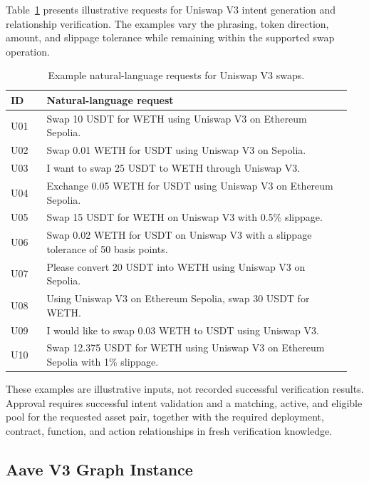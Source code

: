 \medskip

Table~\ref{tab:uniswap_user_queries} presents illustrative
requests for Uniswap V3 intent generation and relationship
verification. The examples vary the phrasing, token
direction, amount, and slippage tolerance while remaining
within the supported swap operation.

\begin{table}[htbp]
\centering
\small
\renewcommand{\arraystretch}{1.15}
\caption{Example natural-language requests for Uniswap V3 swaps.}
\label{tab:uniswap_user_queries}
\begin{tabular}{@{}p{0.10\linewidth}p{0.85\linewidth}@{}}
\hline
\textbf{ID} & \textbf{Natural-language request} \\
\hline
U01 & Swap 10 USDT for WETH using Uniswap V3 on Ethereum Sepolia. \\
U02 & Swap 0.01 WETH for USDT using Uniswap V3 on Sepolia. \\
U03 & I want to swap 25 USDT to WETH through Uniswap V3. \\
U04 & Exchange 0.05 WETH for USDT using Uniswap V3 on Ethereum Sepolia. \\
U05 & Swap 15 USDT for WETH on Uniswap V3 with 0.5\% slippage. \\
U06 & Swap 0.02 WETH for USDT on Uniswap V3 with a slippage tolerance of 50 basis points. \\
U07 & Please convert 20 USDT into WETH using Uniswap V3 on Sepolia. \\
U08 & Using Uniswap V3 on Ethereum Sepolia, swap 30 USDT for WETH. \\
U09 & I would like to swap 0.03 WETH to USDT using Uniswap V3. \\
U10 & Swap 12.375 USDT for WETH using Uniswap V3 on Ethereum Sepolia with 1\% slippage. \\
\hline
\end{tabular}
\end{table}

These examples are illustrative inputs, not recorded
successful verification results. Approval requires
successful intent validation and a matching, active,
and eligible pool for the requested asset pair, together
with the required deployment, contract, function, and
action relationships in fresh verification knowledge.



\subsection{Aave V3 Graph Instance}


